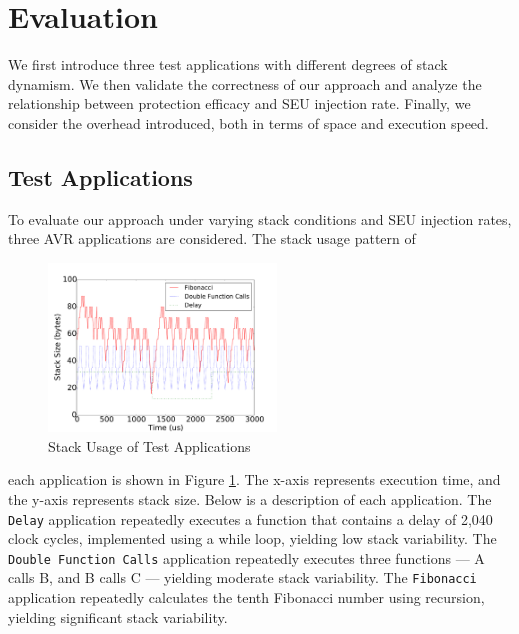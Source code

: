 \section{Evaluation}\label{sec:evaluation}
We first introduce three test applications with different degrees of stack dynamism. We then validate the correctness of our approach and analyze the relationship between protection efficacy and SEU injection rate. Finally, we consider the overhead introduced, both in terms of space and execution speed.
\subsection{Test Applications}
To evaluate our approach under varying stack conditions and SEU injection rates, three AVR applications are considered. The stack usage pattern of 
\begin{figure}
	\vspace{-20pt}
	\begin{center}
		\includegraphics[width=0.54\textwidth]{figures/stacksize_usage_v3.pdf}
	\end{center}
	\vspace{-20pt}
	\caption{Stack Usage of Test Applications}\label{fig:stacksize_usage}
	\vspace{-15pt}
\end{figure}
each application is shown in Figure \ref{fig:stacksize_usage}. The x-axis represents execution time, and the y-axis represents stack size. Below is a description of each application. The \texttt{Delay} application repeatedly executes a function that contains a delay of 2,040 clock cycles, implemented using a while loop, yielding low stack variability. The \texttt{Double Function Calls} application repeatedly executes three functions --- A calls B, and B calls C --- yielding moderate stack variability. The \texttt{Fibonacci} application repeatedly calculates the tenth Fibonacci number using recursion, yielding significant stack variability.
